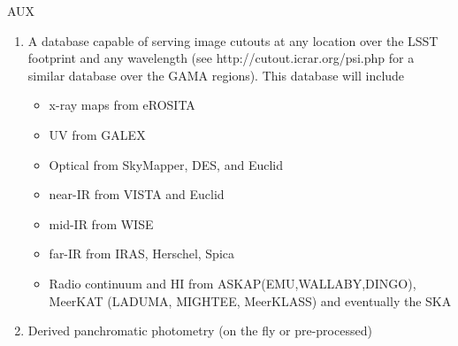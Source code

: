 {\begin{tasklist}{AUX}
\begin{task}
{\begin{enumerate}
\item A database capable of serving image cutouts at any location over the LSST footprint and any wavelength (see http://cutout.icrar.org/psi.php for a similar database over the GAMA regions). This database will include
\begin{itemize}
\item x-ray maps from eROSITA
\item UV from GALEX
\item Optical from SkyMapper, DES, and Euclid
\item near-IR from VISTA and Euclid
\item mid-IR from WISE
\item far-IR from IRAS, Herschel, Spica
\item Radio continuum and HI from ASKAP(EMU,WALLABY,DINGO), MeerKAT (LADUMA, MIGHTEE, MeerKLASS) and eventually the SKA
\end{itemize}
\item Derived panchromatic photometry (on the fly or pre-processed)
\end{enumerate}
}
\end{task}


\end{tasklist}}
